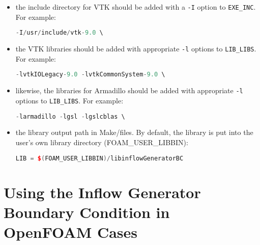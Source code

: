 \documentclass{sd_report}
\begin{document}
\begin{itemize}
\item the include directory for VTK should be added with a \texttt{-I} option to \texttt{EXE\_INC}. For example:

\begin{lstlisting}[language=c++]
   -I/usr/include/vtk-9.0 \
\end{lstlisting}

\item the VTK libraries should be added with appropriate \texttt{-l} options to \texttt{LIB\_LIBS}. For example:

\begin{lstlisting}[language=c++]
    -lvtkIOLegacy-9.0 -lvtkCommonSystem-9.0 \
\end{lstlisting}

\item likewise, the libraries for Armadillo should be added with appropriate \texttt{-l} options to \texttt{LIB\_LIBS}. For example:

\begin{lstlisting}[language=c++]
    -larmadillo -lgsl -lgslcblas \
\end{lstlisting}

\item the library output path in Make/files. By default, the library is put into the user's own library directory (FOAM\_USER\_LIBBIN):

\begin{lstlisting}[language=c++]
LIB = $(FOAM_USER_LIBBIN)/libinflowGeneratorBC
\end{lstlisting}

\end{itemize}

\section{Using the Inflow Generator Boundary Condition in OpenFOAM Cases}
\end{document}
